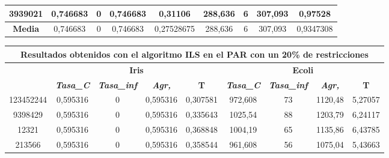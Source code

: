 \documentclass[12pt, spanish]{article}
\begin{document}
\begin{table}[H]
\begin{tabular}{|c|c|c|c|c|c|c|c|c|}
3939021           & 0,746683                  & 0                           & 0,746683               & 0,31106    & 288,636                   & 6                           & 307,093                & 0,97528    \\ \hline
\textbf{Media}    & 0,746683                  & 0                           & 0,746683               & 0,27528675 & 288,636                   & 6                           & 307,093                & 0,9347308  \\ \hline
\end{tabular}
\end{table}


\begin{table}[H]
\begin{tabular}{|c|c|c|c|c|c|c|c|c|}
\hline
\multicolumn{9}{|c|}{\textbf{Resultados obtenidos con el algoritmo ILS en el PAR con un 20\% de restricciones}}                                                                                                   \\ \hline
\multirow{2}{*}{} & \multicolumn{4}{c|}{\textbf{Iris}}                                                            & \multicolumn{4}{c|}{\textbf{Ecoli}}                                                           \\ \cline{2-9} 
                  & \textit{\textbf{Tasa\_C}} & \textit{\textbf{Tasa\_inf}} & \textit{\textbf{Agr,}} & \textbf{T} & \textit{\textbf{Tasa\_C}} & \textit{\textbf{Tasa\_inf}} & \textit{\textbf{Agr,}} & \textbf{T} \\ \hline
123452244         & 0,595316                  & 0                           & 0,595316               & 0,307581   & 972,608                   & 73                          & 1120,48                & 5,27057    \\ \hline
9398429           & 0,595316                  & 0                           & 0,595316               & 0,335643   & 1025,54                   & 88                          & 1203,79                & 6,24117    \\ \hline
12321             & 0,595316                  & 0                           & 0,595316               & 0,368848   & 1004,19                   & 65                          & 1135,86                & 6,43785    \\ \hline
213566            & 0,595316                  & 0                           & 0,595316               & 0,358544   & 961,608                   & 56                          & 1075,04                & 5,43663    \\ \hline

\end{tabular}
\end{table}
\end{document}
